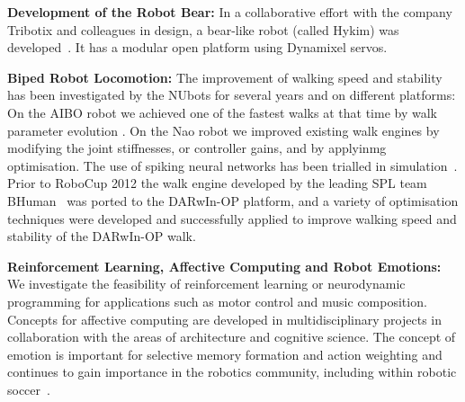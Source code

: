 \documentclass{llncs}
\begin{document}

\noindent\textbf{Development of the Robot Bear:} In a collaborative effort with the company Tribotix and colleagues in design, a bear-like robot (called Hykim) was developed~\cite{ChalupEtAl2006}. It has a modular open platform using Dynamixel servos.

\noindent\textbf{Biped Robot Locomotion:} The improvement of walking speed and stability has been investigated by the NUbots for several years and on different platforms: On the AIBO robot we achieved one of the fastest walks at that time by walk parameter evolution \cite{QuinlanEtAlACRA2003,ChalupEtAlSMC2007}. On the Nao robot we improved existing walk engines by modifying the joint stiffnesses, or controller gains, \cite{Kulk2008,Kulk2010} and by applyinmg optimisation. %
The use of spiking neural networks has been trialled in simulation~\cite{WiklendtChalup2008}. Prior to RoboCup 2012 the walk engine developed by the leading SPL team BHuman~\cite{BHumanWalk2010} was ported to the DARwIn-OP platform, and a variety of optimisation techniques were developed and successfully applied to improve walking speed and stability of the DARwIn-OP walk. %

\noindent\textbf{Reinforcement Learning, Affective Computing and Robot Emotions:} We investigate the feasibility of reinforcement learning or neurodynamic programming for applications such as motor control and music composition. Concepts for affective computing are developed in multidisciplinary projects in collaboration with the areas of architecture and cognitive science. The concept of emotion is important for selective memory formation and action weighting and continues to gain importance in the robotics community, including within robotic soccer~\cite{HongEtAl2014,FountainEtAl2014,ChalupOstwald2009,WalkerChalup2015,WongEtAl2012,WongEtAl2013}.
\end{document}
